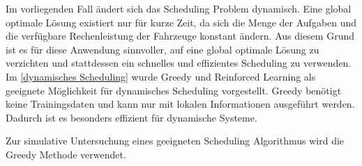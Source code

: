 Im vorliegenden Fall ändert sich das Scheduling Problem dynamisch. Eine global optimale Lösung existiert nur für kurze Zeit, da sich die Menge der Aufgaben und die verfügbare Rechenleistung der Fahrzeuge konstant ändern. Aus diesem Grund ist es für diese Anwendung sinnvoller, auf eine global optimale Lösung zu verzichten und stattdessen ein schnelles und effizientes Scheduling zu verwenden. Im \autoref{dynamisches Scheduling} wurde Greedy und Reinforced Learning als geeignete Möglichkeit für dynamisches Scheduling vorgestellt. Greedy benötigt keine Trainingsdaten und kann nur mit lokalen Informationen ausgeführt werden. Dadurch ist es besonders effizient für dynamische Systeme.

Zur simulative Untersuchung eines geeigneten Scheduling Algorithmus wird die Greedy Methode verwendet. 